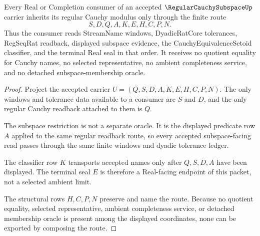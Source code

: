 \begin{theorem}
\label{thm:regular-cauchy-subspace-inherited-modulus-route}
Every Real or Completion consumer of an accepted $\RegularCauchySubspaceUp$ carrier inherits its regular Cauchy modulus only through the finite route
$$
S,D,Q,A,K,E,H,C,P,N.
$$
Thus the consumer reads StreamName windows, DyadicRatCore tolerances, RegSeqRat readback, displayed subspace evidence, the CauchyEquivalenceSetoid classifier, and the terminal Real seal in that order. It receives no quotient equality for Cauchy names, no selected representative, no ambient completeness service, and no detached subspace-membership oracle.
\end{theorem}
\begin{proof}
Project the accepted carrier $U=(Q,S,D,A,K,E,H,C,P,N)$. The only windows and tolerance data available to a consumer are $S$ and $D$, and the only regular Cauchy readback attached to them is $Q$.

The subspace restriction is not a separate oracle. It is the displayed predicate row $A$ applied to the same regular readback route, so every accepted subspace-facing read passes through the same finite windows and dyadic tolerance ledger.

The classifier row $K$ transports accepted names only after $Q,S,D,A$ have been displayed. The terminal seal $E$ is therefore a Real-facing endpoint of this packet, not a selected ambient limit.

The structural rows $H,C,P,N$ preserve and name the route. Because no quotient equality, selected representative, ambient completeness service, or detached membership oracle is present among the displayed coordinates, none can be exported by composing the route.
\end{proof}


